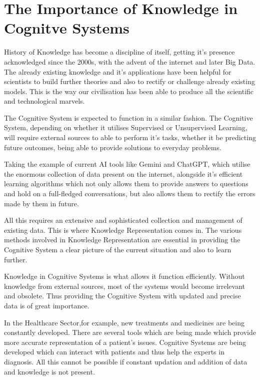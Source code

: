 \section{The Importance of Knowledge in Cognitve Systems}\label{The Importance of Knowledge in Cognitive Systems}

History of Knowledge has become a discipline of itself, getting it's presence
acknowledged since the 2000s, with the advent of the internet and later Big
Data. The already existing knowledge and it's applications have been helpful
for scientists to build further theories and also to rectify or challenge
already existing models. This is the way our civilisation has been able to
produce all the scientific and technological marvels.


The Cognitive System is expected to function in a similar fashion. The
Cognitive System, depending on whether it utilises Supervised or Unsupervised
Learning, will require external sources to able to perform it's tasks, whether
it be predicting future outcomes, being able to provide solutions to everyday
problems.


Taking the example of current AI tools like Gemini and ChatGPT, which utilise
the enormous collection of data present on the internet, alongside it's
efficient learning algorithms which not only allows them to provide answers to
questions and hold on a full-fledged conversations, but also allows them to
rectify the errors made by them in future.


All this requires an extensive and sophisticated collection and management of
existing data. This is where Knowledge Representation comes in. The various
methods involved in Knowledge Representation are essential in providing the
Cognitive System a clear picture of the current situation and also to learn
further.

Knowledge in Cognitive Systems is what allows it function efficiently. Without
knowledge from external sources, most of the systems would become irrelevant
and obsolete. Thus providing the Cognitive System with updated and precise data
is of great importance.

In the Healthcare Sector,for example, new treatments and medicines are being
constantly developed. There are several tools which are being made which
provide more accurate representation of a patient's issues. Cognitive Systems
are being developed which can interact with patients and thus help the experts
in diagnosis. All this cannot be possible if constant updation and addition of
data and knowledge is not present.


